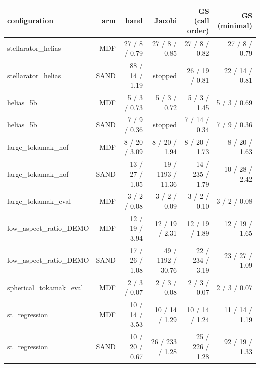 \begin{tabular}{lrrrrr}
\toprule
configuration & arm & hand & Jacobi & GS (call order) & GS (minimal) \\
\midrule
stellarator\_helias & MDF & 27 / 8 / 0.79 & 27 / 8 / 0.85 & 27 / 8 / 0.82 & 27 / 8 / 0.79 \\
stellarator\_helias & SAND & 88 / 14 / 1.19 & stopped & 26 / 19 / 0.81 & 22 / 14 / 0.81 \\
helias\_5b & MDF & 5 / 3 / 0.73 & 5 / 3 / 0.72 & 5 / 3 / 1.45 & 5 / 3 / 0.69 \\
helias\_5b & SAND & 7 / 9 / 0.36 & stopped & 7 / 14 / 0.34 & 7 / 9 / 0.36 \\
large\_tokamak\_nof & MDF & 8 / 20 / 3.09 & 8 / 20 / 1.94 & 8 / 20 / 1.73 & 8 / 20 / 1.63 \\
large\_tokamak\_nof & SAND & 13 / 27 / 1.05 & 19 / 1193 / 11.36 & 14 / 235 / 1.79 & 10 / 28 / 2.42 \\
large\_tokamak\_eval & MDF & 3 / 2 / 0.08 & 3 / 2 / 0.09 & 3 / 2 / 0.10 & 3 / 2 / 0.08 \\
low\_aspect\_ratio\_DEMO & MDF & 12 / 19 / 3.94 & 12 / 19 / 2.31 & 12 / 19 / 1.89 & 12 / 19 / 1.65 \\
low\_aspect\_ratio\_DEMO & SAND & 17 / 26 / 1.08 & 49 / 1192 / 30.76 & 22 / 234 / 3.19 & 23 / 27 / 1.09 \\
spherical\_tokamak\_eval & MDF & 2 / 3 / 0.07 & 2 / 3 / 0.08 & 2 / 3 / 0.07 & 2 / 3 / 0.07 \\
st\_regression & MDF & 10 / 14 / 3.53 & 10 / 14 / 1.29 & 10 / 14 / 1.24 & 11 / 14 / 1.19 \\
st\_regression & SAND & 10 / 20 / 0.67 & 26 / 233 / 1.28 & 25 / 226 / 1.28 & 92 / 19 / 1.33 \\
\bottomrule
\end{tabular}
